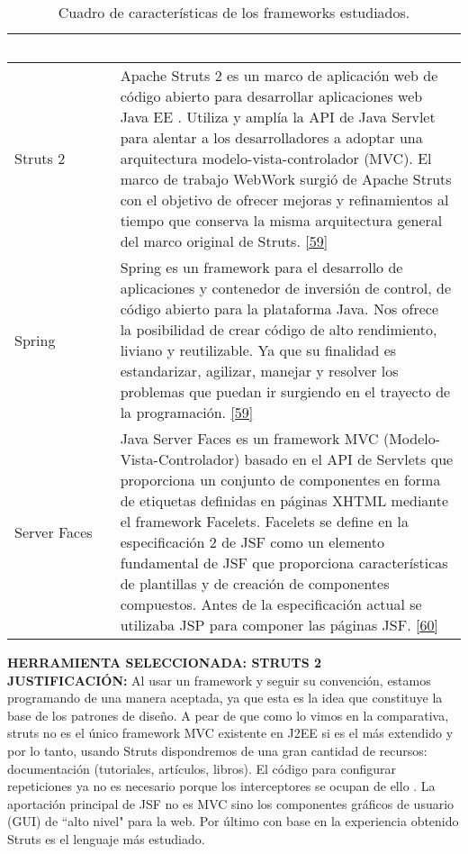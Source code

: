 \begin{table}[H]
	\centering
	\begin{tabular}{|p{3cm}|p{12cm}|}
		\hline
		\rowcolor{black} \textcolor{white} {\textbf{Herramienta}} & \textcolor{white}{\textbf{Características}}  \\ \hline
		Struts 2 & Apache Struts 2 es un marco de aplicación web de código abierto para desarrollar aplicaciones web Java EE . Utiliza y amplía la API de Java Servlet para alentar a los desarrolladores a adoptar una arquitectura modelo-vista-controlador (MVC). El marco de trabajo WebWork surgió de Apache Struts con el objetivo de ofrecer mejoras y refinamientos al tiempo que conserva la misma arquitectura general del marco original de Struts. \hyperlink{b59}{[59]} \\
		\hline
		Spring & Spring es un framework para el desarrollo de aplicaciones y contenedor de inversión de control, de código abierto para la plataforma Java. Nos ofrece la posibilidad de crear código de alto rendimiento, liviano y reutilizable. Ya que su finalidad es estandarizar, agilizar, manejar y resolver los problemas que puedan ir surgiendo en el trayecto de la programación. \hyperlink{b59}{[59]} \\
		\hline
		Server Faces & Java Server Faces es un framework MVC (Modelo-Vista-Controlador) basado en el API de Servlets que proporciona un conjunto de componentes en forma de etiquetas definidas en páginas XHTML mediante el framework Facelets. Facelets se define en la especificación 2 de JSF como un elemento fundamental de JSF que proporciona características de plantillas y de creación de componentes compuestos. Antes de la especificación actual se utilizaba JSP para componer las páginas JSF. \hyperlink{b60}{[60]}\\
		\hline
	\end{tabular}
\caption{Cuadro de características de los frameworks estudiados.}
\label{tbl:frame}
\end{table}

\textbf {HERRAMIENTA SELECCIONADA: STRUTS 2}\\

\textbf {JUSTIFICACIÓN:}
Al usar un framework y seguir su convención, estamos programando de una manera aceptada, ya que esta es la idea que constituye la base de los patrones de diseño.  A pear de que como lo vimos en la comparativa, struts no es el único framework MVC existente en J2EE si es el más extendido y por lo tanto, usando Struts dispondremos de una gran cantidad de recursos: documentación (tutoriales, artículos, libros). El código para configurar repeticiones ya no es necesario porque los interceptores se ocupan de ello . La aportación principal de JSF no es MVC sino los componentes gráficos de usuario (GUI) de ``alto nivel" para la web. Por último con base en la experiencia obtenido Struts es el lenguaje más estudiado.\\

